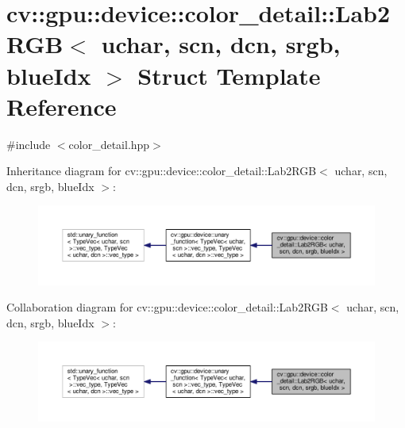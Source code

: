 \hypertarget{structcv_1_1gpu_1_1device_1_1color__detail_1_1Lab2RGB_3_01uchar_00_01scn_00_01dcn_00_01srgb_00_01blueIdx_01_4}{\section{cv\-:\-:gpu\-:\-:device\-:\-:color\-\_\-detail\-:\-:Lab2\-R\-G\-B$<$ uchar, scn, dcn, srgb, blue\-Idx $>$ Struct Template Reference}
\label{structcv_1_1gpu_1_1device_1_1color__detail_1_1Lab2RGB_3_01uchar_00_01scn_00_01dcn_00_01srgb_00_01blueIdx_01_4}
}


{\ttfamily \#include $<$color\-\_\-detail.\-hpp$>$}



Inheritance diagram for cv\-:\-:gpu\-:\-:device\-:\-:color\-\_\-detail\-:\-:Lab2\-R\-G\-B$<$ uchar, scn, dcn, srgb, blue\-Idx $>$\-:\nopagebreak
\begin{figure}[H]
\begin{center}
\leavevmode
\includegraphics[width=350pt]{structcv_1_1gpu_1_1device_1_1color__detail_1_1Lab2RGB_3_01uchar_00_01scn_00_01dcn_00_01srgb_00_01blueIdx_01_4__inherit__graph}
\end{center}
\end{figure}


Collaboration diagram for cv\-:\-:gpu\-:\-:device\-:\-:color\-\_\-detail\-:\-:Lab2\-R\-G\-B$<$ uchar, scn, dcn, srgb, blue\-Idx $>$\-:\nopagebreak
\begin{figure}[H]
\begin{center}
\leavevmode
\includegraphics[width=350pt]{structcv_1_1gpu_1_1device_1_1color__detail_1_1Lab2RGB_3_01uchar_00_01scn_00_01dcn_00_01srgb_00_01blueIdx_01_4__coll__graph}
\end{center}
\end{figure}
